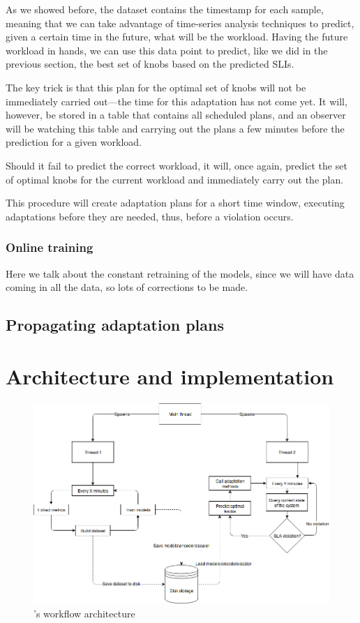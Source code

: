 As we showed before, the dataset contains the timestamp for each sample, meaning that we can take advantage of time-series analysis techniques to predict, given a certain time in the future, what will be the workload. Having the future workload in hands, we can use this data point to predict, like we did in the previous section, the best set of knobs based on the predicted SLIs.

The key trick is that this plan for the optimal set of knobs will not be immediately carried out---the time for this adaptation has not come yet. It will, however, be stored in a table that contains all scheduled plans, and an observer will be watching this table and carrying out the plans a few minutes before the prediction for a given workload.

Should it fail to predict the correct workload, it will, once again, predict the set of optimal knobs for the current workload and immediately carry out the plan.

This procedure will create adaptation plans for a short time window, executing adaptations before they are needed, thus, before a violation occurs.


\subsubsection{Online training}

Here we talk about the constant retraining of the models, since we will have data coming in all the data, so lots of corrections to be made.

\subsection{Propagating adaptation plans}

\section{Architecture and implementation}

\begin{figure}[t]
  \includegraphics[scale=0.5]{images/FinchArchitecture.png}
  \caption{\projectname{}'s workflow architecture}
  \label{fig:finch2}
\end{figure}

